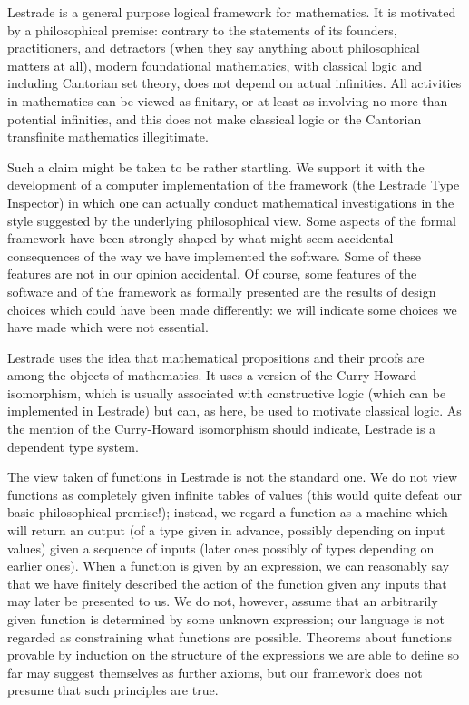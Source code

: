 \documentclass[12pt]{article}
\begin{document}
Lestrade is a general purpose logical framework for mathematics.  It is motivated by a philosophical premise:  contrary to the statements of its founders, practitioners, and detractors (when they say anything about philosophical matters at all), modern foundational mathematics, with classical logic and including Cantorian set theory, does not depend on actual infinities.  All activities in mathematics can be viewed as finitary, or at least as involving no more than potential infinities, and this does not make classical logic or the Cantorian transfinite mathematics illegitimate.

Such a claim might be taken to be rather startling.  We support it with the development of a computer implementation of the framework (the Lestrade Type Inspector) in which one can actually conduct mathematical investigations in the style suggested by the underlying philosophical view.  Some aspects of the formal framework have been strongly shaped by what might seem accidental consequences of the way we have implemented the software.  Some of these features are not in our opinion accidental.  Of course, some features of the software and of the framework as formally presented are the results of design choices which could have been made differently:  we will indicate some choices we have made which were not essential.

Lestrade uses the idea that mathematical propositions and their proofs are among the objects of mathematics.  It uses a version of the Curry-Howard isomorphism, which is usually associated with constructive logic (which can be implemented in Lestrade) but can, as here, be used to motivate classical logic.
As the mention of the Curry-Howard isomorphism should indicate, Lestrade is a dependent type system.

The view taken of functions in Lestrade is not the standard one.  We do not view functions as completely given infinite tables of values (this would quite defeat our basic philosophical premise!); instead, we regard a function as a machine which will return an output (of a type given in advance, possibly depending on input values) given a sequence of inputs (later ones possibly of types depending on earlier ones).  When a function is given by an expression, we can reasonably say that we have finitely described the action of the function given any inputs that may later be presented to us.  We do  not, however, assume that an arbitrarily given function is determined by some unknown expression;  our language is not regarded as constraining what functions are possible.  Theorems about functions provable by induction on the structure of the expressions we are able to define so far may suggest themselves as further axioms, but our framework does not presume that such principles are true.
\end{document}
